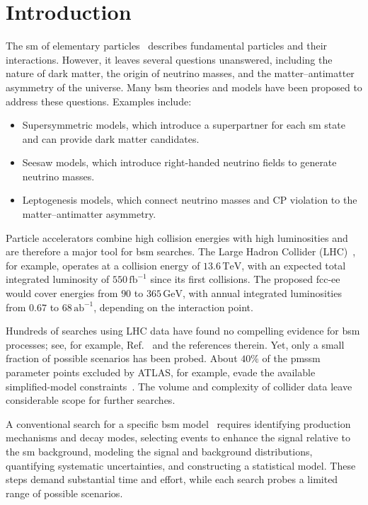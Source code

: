 \documentclass[paper/ddppaper2.tex]{subfiles}
\begin{document}
\section{Introduction}

The \gls{sm} of elementary particles~\cite{Grossman_StandardModel_2023} describes fundamental particles and their interactions. However, it leaves several questions unanswered, including the nature of dark matter, the origin of neutrino masses, and the matter--antimatter asymmetry of the universe. Many \gls{bsm} theories and models have been proposed to address these questions. Examples include:

\begin{itemize}
    \item Supersymmetric models, which introduce a superpartner for each \gls{sm} state and can provide dark matter candidates.
    \item Seesaw models, which introduce right-handed neutrino fields to generate neutrino masses.
    \item Leptogenesis models, which connect neutrino masses and CP violation to the matter--antimatter asymmetry.
\end{itemize}

Particle accelerators combine high collision energies with high luminosities and are therefore a major tool for \gls{bsm} searches. The Large Hadron Collider (LHC)~\cite{CERN_Courier_LHC_Run3}, for example, operates at a collision energy of $13.6\,\mathrm{TeV}$, with an expected total integrated luminosity of $550\,\mathrm{fb}^{-1}$ since its first collisions. The proposed \gls{fcc-ee}~\cite{Benedikt_2026_FCC} would cover energies from $90$ to $365\,\mathrm{GeV}$, with annual integrated luminosities from $0.67$ to $68\,\mathrm{ab}^{-1}$, depending on the interaction point.

Hundreds of searches using LHC data have found no compelling evidence for \gls{bsm} processes; see, for example, Ref.~\cite{PDG_2024} and the references therein. Yet, only a small fraction of possible scenarios has been probed. About $40\%$ of the \gls{pmssm} parameter points excluded by ATLAS, for example, evade the available simplified-model constraints~\cite{Ambrogi_2018_pMSSM_misses}. The volume and complexity of collider data leave considerable scope for further searches.

A conventional search for a specific \gls{bsm} model~\cite{ATLAS_Higgs_2012} requires identifying production mechanisms and decay modes, selecting events to enhance the signal relative to the \gls{sm} background, modeling the signal and background distributions, quantifying systematic uncertainties, and constructing a statistical model. These steps demand substantial time and effort, while each search probes a limited range of possible scenarios.
\end{document}
